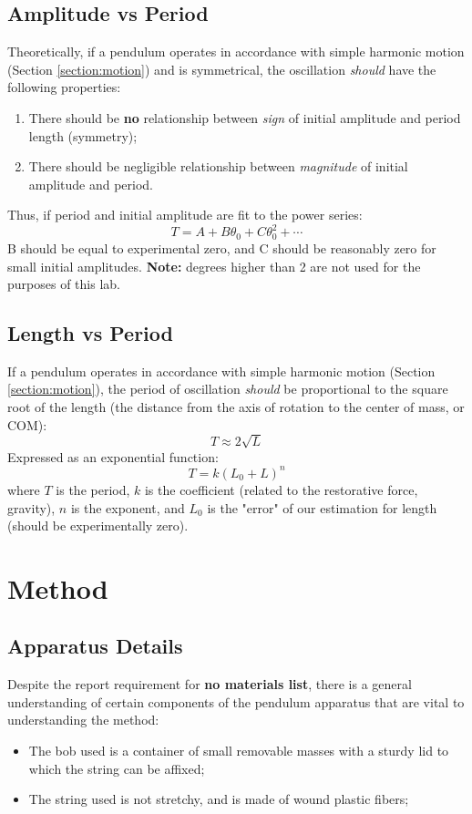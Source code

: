 \documentclass[12pt]{article}
\begin{document}
\subsection{Amplitude vs Period}
\label{powerseries}
Theoretically, if a pendulum operates in accordance with simple harmonic motion (Section \ref{section:motion}) and is symmetrical, the oscillation \emph{should} have the following properties: 
\begin{enumerate}
    \item There should be \textbf{no} relationship between \emph{sign} of initial amplitude and period length (symmetry);
    \item There should be negligible relationship between \emph{magnitude} of initial amplitude and period.
\end{enumerate}
Thus, if period and initial amplitude are fit to the power series:
\begin{equation}
    \label{eqn:powerseries}
    T = A + B\theta_0 + C \theta_0^2 + \cdots
\end{equation}
\noindent
B should be equal to experimental zero, and C should be reasonably zero for small initial amplitudes. \textbf{Note:} degrees higher than 2 are not used for the purposes of this lab.
\pagebreak
\subsection{Length vs Period}
\label{powerlaw}
If a pendulum operates in accordance with simple harmonic motion (Section \ref{section:motion}), the period of oscillation \emph{should} be proportional to the square root of the length (the distance from the axis of rotation to the center of mass, or COM):
$$
T \approx 2\sqrt{L}
$$
Expressed as an exponential function:
\begin{equation}
    \label{eqn:powerlaw}
    T = k(L_0 + L)^n
\end{equation}
\noindent
where $T$ is the period, $k$ is the coefficient (related to the restorative force, gravity), $n$ is the exponent, and $L_0$ is the "error" of our estimation for length (should be experimentally zero).

\section{Method}
\label{section:method}
\subsection{Apparatus Details}
\label{section:materials}
Despite the report requirement for \textbf{no materials list}, there is a general understanding of certain components of the pendulum apparatus that are vital to understanding the method:
\begin{itemize}
    \item The bob used is a container of small removable masses with a sturdy lid to which the string can be affixed;
    \item The string used is not stretchy, and is made of wound plastic fibers;
\end{itemize}
\end{document}
